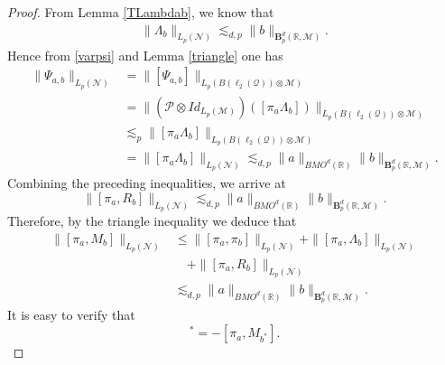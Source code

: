 \documentclass[oneside,english,a4wide]{amsart}
\numberwithin{equation}{section}
\numberwithin{figure}{section}
\theoremstyle{plain}
\theoremstyle{plain}
\theoremstyle{definition}
\theoremstyle{plain}
\theoremstyle{remark}
\theoremstyle{definition}
\theoremstyle{remark}
\theoremstyle{definition}
\newcommand{\8}{\infty}
\begin{document}
\begin{proof}
	From Lemma \ref{TLambdab}, we know that
	\begin{equation*}
		\begin{aligned}
			\|\varLambda_b\|_{L_p( \mathcal{N})}\lesssim_{d, p}\|b\|_{\pmb{B}_p^{d}(\mathbb{R},\mathcal{M})}.
		\end{aligned}
	\end{equation*}
	Hence from \eqref{varpsi} and Lemma \ref{triangle} one has
	\begin{equation*}\label{piarb2}
		\begin{aligned}
			\|\varPsi_{a,b}\|_{L_p(\mathcal{N})}{}&=\|[\varPsi_{a,b}]\|_{L_p(B(\ell_2(\mathcal{Q}))\otimes \mathcal{M})}\\
			&=\|(\mathcal{P}\otimes Id_{L_p(\mathcal{M})})([\pi_{a}\varLambda_{b}])\|_{L_p(B(\ell_2(\mathcal{Q}))\otimes \mathcal{M})}\\
			&\lesssim_p \|[\pi_{a}\varLambda_{b}]\|_{L_p(B(\ell_2(\mathcal{Q}))\otimes \mathcal{M})}\\
			&=\|[\pi_{a}\varLambda_{b}]\|_{L_p(\mathcal{N})}
			\lesssim_{d, p}\|a\|_{BMO^d(\mathbb{R})}\|b\|_{\pmb{B}_p^{d}(\mathbb{R},\mathcal{M})}.
		\end{aligned}
	\end{equation*}
	Combining the preceding inequalities, we arrive at
	\begin{equation*}
		\|[\pi_a,R_b]\|_{L_p(\mathcal{N})}\lesssim_{d,p}\|a\|_{BMO^d(\mathbb{R})} \|b\|_{\pmb{B}_p^{d}(\mathbb{R},\mathcal{M})}.
	\end{equation*}
		Therefore, by the triangle inequality we deduce that
		\begin{equation*}
			\begin{aligned}
				\|[\pi_a,M_b]\|_{L_p(\mathcal{N})}{}&\le \|[\pi_a,\pi_b]\|_{L_p(\mathcal{N})}+\|[\pi_a,\varLambda_b]\|_{L_p(\mathcal{N})}\\
				&\quad+\|[\pi_a,R_b]\|_{L_p(\mathcal{N})}\\
				&\lesssim_{d,p}\|a\|_{BMO^d(\mathbb{R})} \|b\|_{\pmb{B}_p^{d}(\mathbb{R},\mathcal{M})}.
			\end{aligned}
		\end{equation*}
			It is easy to verify that 
		\begin{equation*}
			[\pi_a^*,M_b]^*=-[\pi_a,M_{b^*}].

\end{equation*}
\end{proof}
\end{document}
